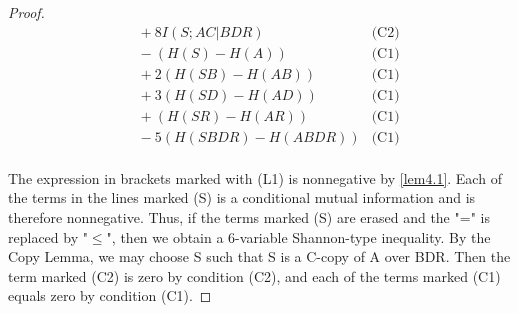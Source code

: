 \documentclass[10pt,journal]{IEEEtran}
\begin{document}
\begin{proof}
\begin{align*}
      &\ \   + 8I(S;AC|BDR)                                                     & \text{(C2)} \\
      &\ \   - (H(S)-H(A))                                                      & \text{(C1)} \\
      &\ \   + 2(H(SB)-H(AB))                                                     & \text{(C1)} \\
      &\ \   + 3(H(SD)-H(AD))                                                    & \text{(C1)} \\
      &\ \   + (H(SR)-H(AR))                                                     & \text{(C1)} \\
      &\ \   - 5(H(SBDR)-H(ABDR))                                                      & \text{(C1)} \\
\end{align*}

The expression in brackets marked with (L1) is nonnegative by \eqref{lem4.1}.
Each of the terms in the lines marked (S) is a conditional mutual
information and is therefore nonnegative.  Thus, if the terms marked (S)
are erased and the "=" is replaced by "$\leq$", then we obtain a 6-variable
Shannon-type inequality.  By the Copy Lemma, we may choose S such
that S is a C-copy of A over BDR.  Then the term marked (C2) is zero
by condition (C2), and each of the terms marked (C1) equals zero
by condition (C1).


\end{proof}
\end{document}
